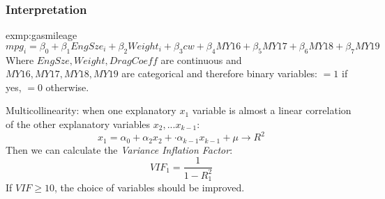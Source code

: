 	\subsubsection*{Interpretation}
		\begin{exmp}{exmp:gasmileage}
			\begin{equation*}
				mpg_i = \beta_0 + \beta_1 EngSze_i + \beta_2 Weight_i + \beta_3 cw + \beta_4 MY16+ \beta_5 MY17 + \beta_6 MY18 + \beta_7 MY19
			\end{equation*}
			Where $EngSze, Weight, DragCoeff$ are continuous and $MY16,MY17,MY18,MY19$ are categorical and therefore binary variables: $=1$ if yes, $=0$ otherwise.
		\end{exmp}
		Multicollinearity: when one explanatory $x_1$ variable is almost a linear correlation of the other explanatory variables $x_2,...x_{k-1}$:
		\begin{equation*}
			x_1=\alpha_0+\alpha_2 x_2 + \cdot \alpha_{k-1} x_{k-1} +\mu \longrightarrow R^2
		\end{equation*}
		Then we can calculate the \emph{Variance Inflation Factor}:
		\begin{equation*}
			VIF_1=\frac{1}{1-R^2_1}
		\end{equation*}
		If $VIF\geq 10$, the choice of variables should be improved.
